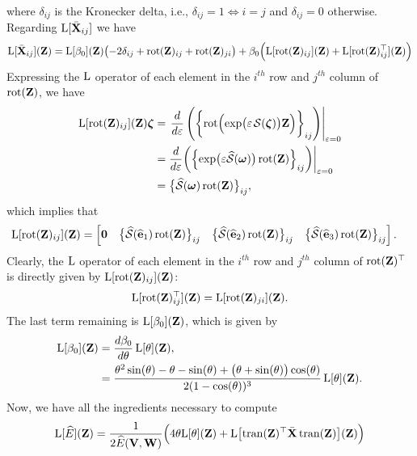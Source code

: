 where $\delta_{ij}$ is the Kronecker delta, i.e., $\delta_{ij}=1 \iff i=j$ and $\delta_{ij}=0$ otherwise. Regarding $\operatorname{L}[\bar{\mathbf{X}}_{ij}]$ we have
\begin{align}
    \operatorname{L}[\bar{\mathbf{X}}_{ij}](\mathbf{Z})= \operatorname{L}[\beta_0](\mathbf{Z})\bigl(-2\delta_{ij}+ \operatorname{rot}(\mathbf{Z})_{ij} + \operatorname{rot}(\mathbf{Z})_{ji}\bigr) + \beta_0\Bigl(\operatorname{L}[\operatorname{rot}(\mathbf{Z})_{ij}](\mathbf{Z}) + \operatorname{L}[\operatorname{rot}(\mathbf{Z})_{ij}^\top](\mathbf{Z})\Bigr)
\end{align}
Expressing the $\operatorname{L}$ operator of  each element in the $i^{th}$ row and $j^{th}$ column of $\operatorname{rot}(\mathbf{Z})$, we have
\begin{align}
    \Lop[\rot(\mathbf{Z})_{ij}](\mathbf{Z})\boldsymbol{\zeta} &=  \left.\frac{d}{d\varepsilon}\left(\biggl\{\rot\Bigl(\exp\bigl(\varepsilon\SL[\boldsymbol{\zeta}]\bigr)\mathbf{Z}\Bigr)\biggr\}_{ij}\right)\right|_{\varepsilon=0}\\
    &=  \frac{d}{d\varepsilon}\biggl(\Bigl\{\exp\bigl(\varepsilon\widehat{\mathcal{S}}(\boldsymbol{\omega})\bigr)\rot(\mathbf{Z})\Bigr\}_{ij}\biggr)\biggr|_{\varepsilon=0}\\
    &=\bigl\{\widehat{\mathcal{S}}(\boldsymbol{\omega})\rot(\mathbf{Z})\bigr\}_{ij},
\end{align}
which implies that
\begin{align}
    \operatorname{L}[\operatorname{rot}(\mathbf{Z})_{ij}](\mathbf{Z}) &= \begin{bmatrix}
        \mathbf{0} & \bigl\{\widehat{\mathcal{S}}(\widehat{\mathbf{e}}_1)\operatorname{rot}(\mathbf{Z})\bigr\}_{ij} & \bigl\{\widehat{\mathcal{S}}(\widehat{\mathbf{e}}_2)\operatorname{rot}(\mathbf{Z})\bigr\}_{ij} & \bigl\{\widehat{\mathcal{S}}(\widehat{\mathbf{e}}_3)\operatorname{rot}(\mathbf{Z})\bigr\}_{ij}
    \end{bmatrix}.
\end{align}
Clearly, the $\operatorname{L}$ operator of each element in the $i^{th}$ row and $j^{th}$ column of $\operatorname{rot}(\mathbf{Z})^\top$ is directly given by $\operatorname{L}[\operatorname{rot}(\mathbf{Z})_{ij}](\mathbf{Z})$:
\begin{align}
    \operatorname{L}[\operatorname{rot}(\mathbf{Z})^\top_{ij}](\mathbf{Z}) = \operatorname{L}[\operatorname{rot}(\mathbf{Z})_{ji}](\mathbf{Z}).
\end{align}
The last term remaining is $\operatorname{L}[\beta_0](\mathbf{Z})$, which is given by
\begin{align}
    \operatorname{L}[\beta_0](\mathbf{Z}) &= \frac{d\beta_0}{d\theta} \operatorname{L}[\theta](\mathbf{Z}),\\
    &= \frac{\theta^2\sin(\theta) - \theta - \sin(\theta) + \bigl(\theta + \sin(\theta)\bigr) \cos(\theta)}{2 (1 - \cos(\theta))^3} \operatorname{L}[\theta](\mathbf{Z}).
\end{align}
Now, we have all the ingredients necessary to compute
\begin{align}
    \operatorname{L}[\widehat{E}](\mathbf{Z}) = \frac{1}{2\widehat{E}(\mathbf{V}, \mathbf{W})} \Bigl(4\theta\text{L}[\theta](\mathbf{Z}) + \text{L}\bigl[\operatorname{tran}(\mathbf{Z})^\top\bar{\mathbf{X}}\operatorname{tran}(\mathbf{Z})\bigr](\mathbf{Z})\Bigr)
\end{align}